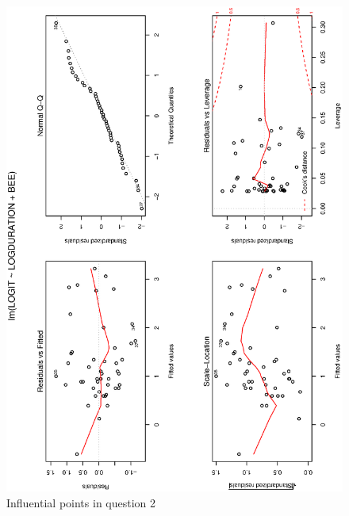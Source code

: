 \documentclass[a4paper,10pt]{article}
\begin{document}
\begin{figure}
\includegraphics[angle=-90, width=1\textwidth]{figures/math650_hw7_fig7.eps}
\caption{Influential points in question 2}\label{f7}
\end{figure}
\end{document}
